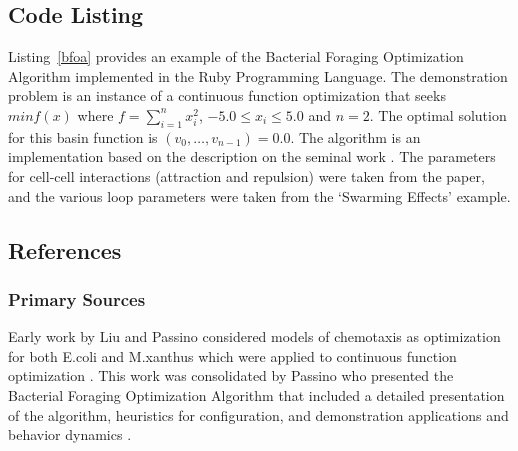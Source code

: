 \subsection{Code Listing}
Listing~\ref{bfoa} provides an example of the Bacterial Foraging Optimization Algorithm implemented in the Ruby Programming Language. 
The demonstration problem is an instance of a continuous function optimization that seeks $min f(x)$ where $f=\sum_{i=1}^n x_{i}^2$, $-5.0\leq x_i \leq 5.0$ and $n=2$. The optimal solution for this basin function is $(v_0,\ldots,v_{n-1})=0.0$.
The algorithm is an implementation based on the description on the seminal work \cite{Passino2002}. The parameters for cell-cell interactions (attraction and repulsion) were taken from the paper, and the various loop parameters were taken from the `Swarming Effects' example.



\subsection{References}

% 
% 
\subsubsection{Primary Sources}
Early work by Liu and Passino considered models of chemotaxis as optimization for both E.coli and M.xanthus which were applied to continuous function optimization \cite{Liu2002}.
This work was consolidated by Passino who presented the Bacterial Foraging Optimization Algorithm that included a detailed presentation of the algorithm, heuristics for configuration, and demonstration applications and behavior dynamics \cite{Passino2002}.

